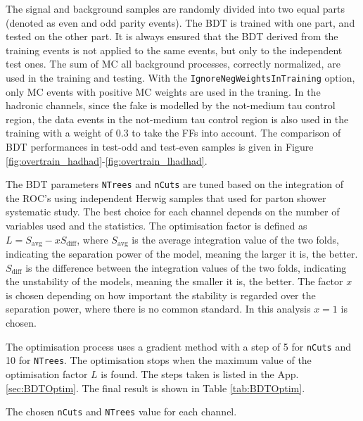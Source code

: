 The signal and background samples are randomly divided into two equal parts (denoted as even and odd parity events). The BDT is trained with one part, and tested on the other part. It is always ensured that the BDT derived from the training events is not applied to the same events, but only to the independent test ones. The sum of MC all background processes, correctly normalized, are used in the training and testing. %
With the \texttt{IgnoreNegWeightsInTraining} option, only MC events with positive MC weights are used in the traning. In the hadronic channels, since the fake is modelled by the not-medium tau control region, the data events in the not-medium tau control region is also used in the training with a weight of 0.3 to take the FFs into account. The comparison of BDT performances in test-odd and test-even samples is given in Figure \ref{fig:overtrain_hadhad}-\ref{fig:overtrain_lhadhad}.

The BDT parameters \texttt{NTrees} and \texttt{nCuts} are tuned based on the integration of the ROC's using independent Herwig samples that used for parton shower
systematic study. The best choice for each channel depends on the number of variables used and the statistics. The optimisation factor is defined as $L=S_\mathrm{avg}-xS_\mathrm{diff}$, where $S_\mathrm{avg}$ is the average integration value of the two folds, indicating the separation power of the model, meaning the larger it is, the better. $S_\mathrm{diff}$ is the difference between the integration values of the two folds, indicating the unstability of the models, meaning the smaller it is, the better. The factor $x$ is chosen depending on how important the stability is regarded over the separation power, where there is no common standard. In this analysis $x=1$ is chosen.

The optimisation process uses a gradient method with a step of 5 for \texttt{nCuts} and 10 for \texttt{NTrees}. The optimisation stops when the maximum value of the optimisation factor $L$ is found. The steps taken is listed in the App. \ref{sec:BDTOptim}. The final result is shown in Table \ref{tab:BDTOptim}.



\begin{table}
\caption{The chosen \texttt{nCuts} and \texttt{NTrees} value for each channel.}
\label{tab:BDTOptim}


\end{table}

